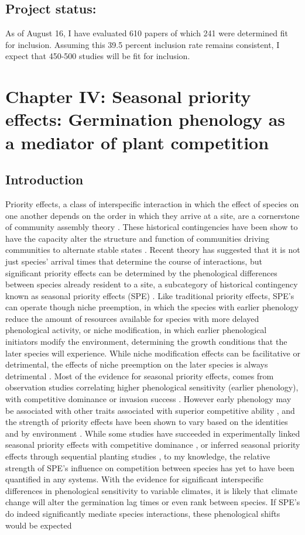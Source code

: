 \documentclass{article}\usepackage[]{graphicx}\usepackage[]{color}
\begin{document}
\subsection*{Project status:}
As of August 16, I have evaluated 610 papers of which 241 were determined fit for inclusion. Assuming this 39.5 percent inclusion rate remains consistent, I expect that 450-500 studies will be fit for inclusion.
\section*{Chapter IV: Seasonal priority effects: Germination phenology as a mediator of plant competition}
\subsection*{Introduction}
\indent\indent Priority effects, a class of interspecific interaction in which the effect of species on one another depends on the order in which they arrive at a site, are a cornerstone of community assembly theory \citep{Fukami2015}. These historical contingencies have been show to have the capacity alter the structure and function of communities driving communities to alternate stable states \citep{Fukami2011}. Recent theory has suggested that it is not just species' arrival times that determine the course of interactions, but significant priority effects can be determined by the phenological differences between species already resident to a site, a subcategory of historical contingency known as seasonal priority effects (SPE) \citep{Wainwright2012}. Like traditional priority effects, SPE's can operate though niche preemption, in which the species with earlier phenology reduce the amount of resources available for species with more delayed phenological activity, or niche modification, in which earlier phenological initiators modify the environment, determining the growth conditions that the later species will experience. While niche modification effects can be facilitative or detrimental, the effects of niche preemption on the later species is always detrimental \citep{Fukami2015}. Most of the evidence for seasonal priority effects, comes from observation studies correlating higher phenological sensitivity (earlier phenology), with competitive dominance or invasion success \citep{Gioria2018}. However early phenology may be associated with other traits associated with superior competitive ability \citep{Dickson2012}, and the strength of priority effects have been shown to vary based on the identities \citep{Cleland2015} and by environment \citep{Kardol2013}.  While some studies have succeeded in experimentally linked seasonal priority effects with competitive dominance \citep{Wainwright2012}, or inferred seasonal priority effects through sequential planting studies \citep{Korner2008}, to my knowledge, the relative strength of SPE's influence on competition between species has yet to have been quantified in any systems. With the evidence for significant interspecific differences in phenological sensitivity to variable climates, it is likely that climate change will alter the germination lag times or even rank between species. If SPE's do indeed significantly mediate species interactions, these phenological shifts would be expected 
\end{document}

